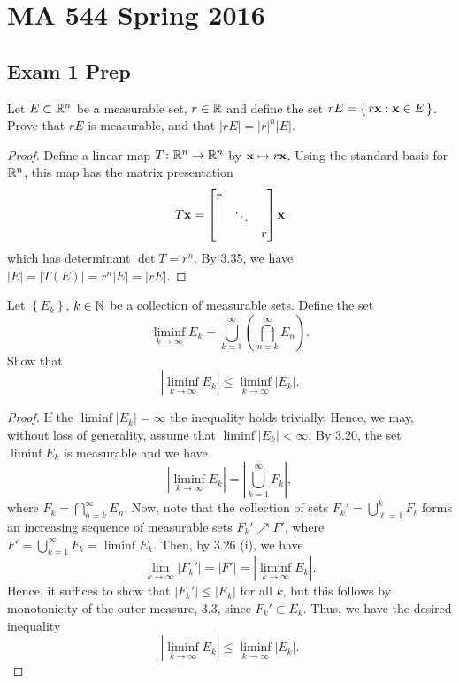 \chapter{MA 544 Spring 2016}
\section{Exam 1 Prep}
\begin{problem}
Let $E\subset\mathbb{R}^n$ be a measurable set, $r\in\mathbb{R}$ and define the set
$rE=\left\{\,r\mathbf{x}:\mathbf{x}\in E\,\right\}$. Prove that $rE$ is
measurable, and that $|rE|=|r|^n|E|$.
\end{problem}
\begin{proof}
Define a linear map $T\colon\mathbb{R}^n\to\mathbb{R}^n$ by $\mathbf{x}\mapsto r\mathbf{x}$. Using
the standard basis for $\mathbb{R}^n$, this map has the matrix presentation
\begin{equation}
\label{eq:matrix-presentation}
T\mathbf{x}=
\begin{bmatrix}
r&\\
&\ddots\\
&&r
\end{bmatrix}\mathbf{x}
\end{equation}
which has determinant $\det T=r^n$. By 3.35, we have
$|E|=|T(E)|=r^n|E|=|rE|$.
\end{proof}

\begin{problem}
Let $\left\{ E_k \right\}$, $k\in\mathbb{N}$ be a collection of measurable
sets. Define the set
\[
\liminf_{k\to\infty} E_k
=\bigcup_{k=1}^\infty\left(\bigcap_{n=k}^\infty E_n\right).
\]
Show that
\[
\left|\liminf_{k\to\infty} E_k\right|\leq\liminf_{k\to\infty}\left|E_k\right|.
\]
\end{problem}
\begin{proof}
If the $\liminf\left|E_k\right|=\infty$ the inequality holds
trivially. Hence, we may, without loss of generality, assume that
$\liminf\left|E_k\right|<\infty$. By 3.20, the set $\liminf E_k$ is
measurable and we have
\begin{equation}
  \label{eq:limsup-rewrite}
\left|\liminf_{k\to\infty} E_k\right|
=\left|\bigcup_{k=1}^\infty F_k\right|,
\end{equation}
where $F_k=\bigcap_{n=k}^\infty E_n$. Now, note that the collection
of sets $F_k'=\bigcup_{\ell=1}^k F_\ell$ forms an increasing
sequence of measurable sets $F_k'\nearrow F'$, where
$F'=\bigcup_{k=1}^\infty F_k=\liminf E_k$. Then, by 3.26 (i), we have
\begin{equation}
  \label{eq:monotone-increasing-limit}
\lim_{k\to\infty}\left|F_k'\right|
=\left|F'\right|
=\left|\liminf_{k\to\infty} E_k\right|.
\end{equation}
Hence, it suffices to show that $\left|F_k'\right|\leq\left|E_k\right|$ for
all $k$, but this follows by monotonicity of the outer measure, 3.3, since
$F_k'\subset E_k$. Thus, we have the desired inequality
\begin{equation}
  \label{eq:meas-liminf-liminf-meas}
\left|\liminf_{k\to\infty} E_k\right|
\leq\liminf_{k\to\infty}\left|E_k\right|.
\end{equation}
\end{proof}

